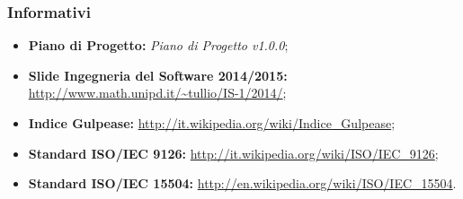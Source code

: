 	\subsubsection{Informativi}
	\begin{itemize}
		\item \textbf{Piano di Progetto:} \textit{Piano di Progetto v1.0.0};
		\item \textbf{Slide Ingegneria del Software 2014/2015:} \url{http://www.math.unipd.it/~tullio/IS-1/2014/};
		\item \textbf{Indice Gulpease:} \url{http://it.wikipedia.org/wiki/Indice_Gulpease};
		\item \textbf{Standard ISO/IEC 9126:} \url{http://it.wikipedia.org/wiki/ISO/IEC_9126};
		\item \textbf{Standard ISO/IEC 15504:} \url{http://en.wikipedia.org/wiki/ISO/IEC_15504}.
	\end{itemize}